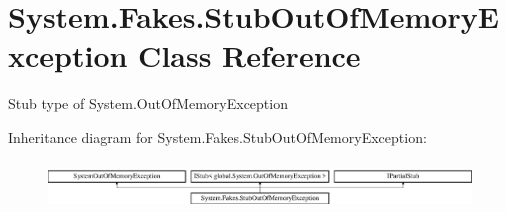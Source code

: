 \hypertarget{class_system_1_1_fakes_1_1_stub_out_of_memory_exception}{\section{System.\-Fakes.\-Stub\-Out\-Of\-Memory\-Exception Class Reference}
\label{class_system_1_1_fakes_1_1_stub_out_of_memory_exception}
}


Stub type of System.\-Out\-Of\-Memory\-Exception 


Inheritance diagram for System.\-Fakes.\-Stub\-Out\-Of\-Memory\-Exception\-:\begin{figure}[H]
\begin{center}
\leavevmode
\includegraphics[height=1.291811cm]{class_system_1_1_fakes_1_1_stub_out_of_memory_exception}
\end{center}
\end{figure}
